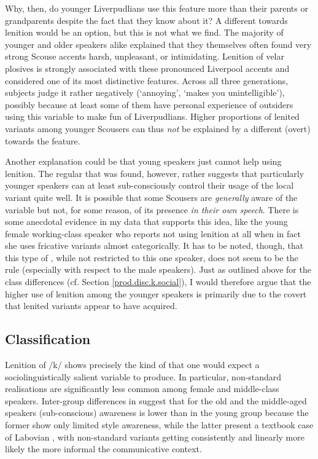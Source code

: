 Why, then, do younger Liverpudlians use this feature more than their parents or grandparents despite the fact that they know about it?
A different  towards lenition would be an option, but this is not what we find.
The majority of younger and older speakers alike explained that they themselves often found very strong Scouse accents harsh, unpleasant, or intimidating.
Lenition of velar plosives is strongly associated with these pronounced Liverpool accents and considered one of its most distinctive features.
Across all three generations, subjects judge it rather negatively (`annoying', `makes you unintelligible'), possibly because at least some of them have personal experience of outsiders using this variable to make fun of Liverpudlians.
Higher proportions of lenited variants among younger Scousers can thus \emph{not} be explained by a different (overt)  towards the feature.

Another explanation could be that young speakers just cannot help using lenition.
The regular  that was found, however, rather suggests that particularly younger speakers can at least sub-consciously control their usage of the local variant quite well.
It is possible that some Scousers are \emph{generally} aware of the variable but not, for some reason, of its presence \emph{in their own speech}.
There is some anecdotal evidence in my data that supports this idea, like the young female working-class speaker who reports not using lenition at all when in fact she uses fricative variants almost categorically.
It has to be noted, though, that this type of , while not restricted to this one speaker, does not seem to be the rule (especially with respect to the male speakers).
Just as outlined above for the class differences (cf. Section \ref{prod.disc.k.social}), I would therefore argue that the higher use of lenition among the younger speakers is primarily due to the covert  that lenited variants appear to have acquired.

\subsection{Classification}
\label{prod.disc.k.classification}

Lenition of /k/ shows precisely the kind of  that one would expect a sociolinguistically salient variable to produce.
In particular, non-standard realisations are significantly less common among female and middle-class speakers.
Inter-group differences in  suggest that for the old and the middle-aged speakers (sub-conscious) awareness is lower than in the young group because the former show only limited style awareness, while the latter present a textbook case of Labovian , with non-standard variants getting consistently and linearly more likely the more informal the communicative context.


